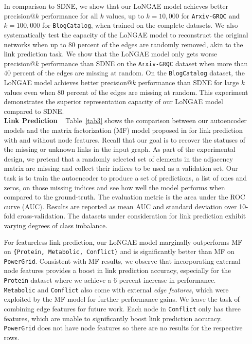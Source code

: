 \documentclass[letterpaper, conference]{IEEEtran}  %
\begin{document}
In comparison to SDNE, we show that our LoNGAE model achieves better precision@$k$ performance for all $k$ values, up to $k=10,000$ for \texttt{Arxiv-GRQC} and $k=100,000$ for \texttt{BlogCatalog}, when trained on the complete datasets. We also systematically test the capacity of the LoNGAE model to reconstruct the original networks when up to 80 percent of the edges are randomly removed, akin to the link prediction task. We show that the LoNGAE model only gets worse precision@$k$ performance than SDNE on the \texttt{Arxiv-GRQC} dataset when more than 40 percent of the edges are missing at random. On the \texttt{BlogCatalog} dataset, the LoNGAE model achieves better precision@$k$ performance than SDNE for large $k$ values even when 80 percent of the edges are missing at random. This experiment demonstrates the superior representation capacity of our LoNGAE model compared to SDNE. \\

\noindent \textbf{Link Prediction} ~ Table~\ref{tab3} shows the comparison between our autoencoder models and the matrix factorization (MF) model proposed in \cite{Menon:2011} for link prediction with and without node features. Recall that our goal is to recover the statuses of the missing or unknown links in the input graph. As part of the experimental design, we pretend that a randomly selected set of elements in the adjacency matrix are missing and collect their indices to be used as a validation set. Our task is to train the autoencoder to produce a set of predictions, a list of ones and zeros, on those missing indices and see how well the model performs when compared to the ground-truth. The evaluation metric is the area under the ROC curve (AUC). Results are reported as mean AUC and standard deviation over 10-fold cross-validation. The datasets under consideration for link prediction exhibit varying degrees of class imbalance.

For featureless link prediction, our LoNGAE model marginally outperforms MF on \texttt{\{Protein, Metabolic, Conflict\}} and is significantly better than MF on \texttt{PowerGrid}. Consistent with MF results, we observe that incorporating external node features provides a boost in link prediction accuracy, especially for the \texttt{Protein} dataset where we achieve a 6 percent increase in performance. \texttt{Metabolic} and \texttt{Conflict} also come with external \emph{edge features}, which were exploited by the MF model for further performance gains. We leave the task of combining edge features for future work. Each node in \texttt{Conflict} only has three features, which are unable to significantly boost link prediction accuracy. \texttt{PowerGrid} does not have node features so there are no results for the respective rows.
\end{document}
